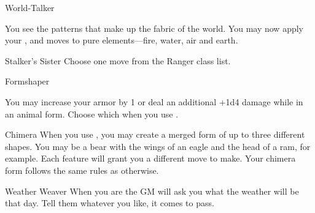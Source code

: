 \documentclass[8pt]{extarticle}
\begin{document}
\begin{multicols}{2}
\begin{amove}{World-Talker}

  You see the patterns that make up the fabric of the world. You may
  now apply your ,  and
   moves to pure elements—fire, water, air and
  earth.
\end{amove}

\begin{amove}{Stalker’s Sister}
  Choose one move from the Ranger class list.
\end{amove}

\begin{amove}{Formshaper}

  You may increase your armor by 1 or deal an additional +1d4 damage
  while in an animal form. Choose which when you use
  .
\end{amove}

\begin{amove}{Chimera}
  When you use , you may create a merged form of up to
  three different shapes. You may be a bear with the wings of an eagle
  and the head of a ram, for example. Each feature will grant you a
  different move to make. Your chimera form follows the same rules as
   otherwise.
\end{amove}

\begin{amove}{Weather Weaver}
  When you are  the GM
  will ask you what the weather will be that day. Tell them whatever
  you like, it comes to pass.
\end{amove}


\vfill\null
\end{multicols}
\end{document}
